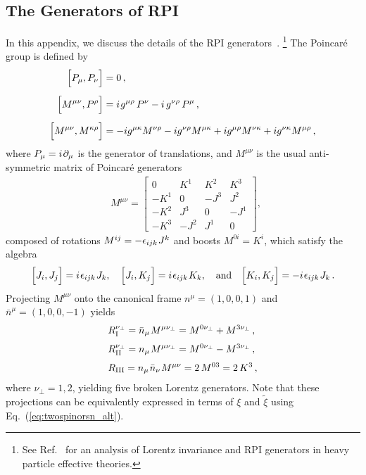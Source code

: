 \documentclass[12pt,document,nofootinbib,superscriptaddress,onecolumn,preprintnumbers,balancelastpage]{article}
\newcommand{\s}{\hspace{0.8pt}}
\DeclareRobustCommand{\Eq}[1]{Eq.~(\ref{#1})}
\DeclareRobustCommand{\Ref}[1]{Ref.~\cite{#1}}
\begin{document}
\begin{spacing}{1.2}
\section{The Generators of RPI}
\label{app:RPIgen}
In this appendix, we discuss the details of the RPI generators~\cite{Kogut:1969xa, Manohar:2002fd}.%
%
\footnote{See \Ref{Heinonen:2012km} for an analysis of Lorentz invariance and RPI generators in heavy particle effective theories.}
%
The Poincar\'e group is defined by
%
\begin{align}
\label{eq:poincare1}
\Big[P_\mu, P_\nu \Big] &= 0\,,\\[5pt] 
\label{eq:poincare2}
\Big[M^{\mu\nu},P^\rho \Big] &= i\s g^{\mu\rho}\,P^\nu-i\,g^{\nu\rho}\,P^\mu \,, \\[5pt]
\label{eq:poincare3}
\Big[M^{\mu \nu}, M^{\kappa \rho}\Big] &= - i g^{\mu \kappa} M^{\nu \rho} - i g^{\nu \rho} M^{\mu \kappa} + i g^{\mu \rho} M^{\nu \kappa} + i g^{\nu \kappa}M^{\mu \rho}\, ,
\end{align}
%
where $P_\mu = i\s  \partial_\mu$ is the generator of translations, and $M^{\mu \nu}$ is the usual anti-symmetric matrix of Poincar\'e generators
%
\begin{align}
& M^{\mu \nu} = 
\left[ \begin{array}{cccc}
0 & K^1 & K^2 & K^3  \\
-K^1 & 0 & - J^3 & J^2 \\
-K^2 & J^3 & 0 & -J^1 \\
-K^3 & - J^2 & J^1 & 0
  \end{array} \right],  \,
\end{align}
%
composed of rotations $M^{ij} = - \epsilon_{ijk}\s J^k$ and boosts $M^{0i} = K^i$, which satisfy the algebra
%
\begin{align}
\Big[J_i , J_j \Big] = i \s\epsilon_{ijk}\s J_k,\quad \Big[ J_i, K_j \Big] = i \s \epsilon_{ijk} \s K_k, \quad \text{and}\quad \Big[ K_i, K_j\Big] = - i\s \epsilon_{ijk} \s J_k\,. 
\end{align}
Projecting $M^{\mu\nu}$ onto the canonical frame $n^\mu = (1,0,0,1)$ and $\bar{n}^\mu = (1,0,0,-1)$ yields
\begin{align}
\label{eq:LCgenbreaking}
&R_{\rm I}^{\nu_\perp} = \bar{n}_\mu\s M^{\mu \nu_\perp} = M^{0 \nu_\perp} + M^{3 \nu_\perp} \,,\\[3pt] \nonumber
&R_{\rm II}^{\nu_\perp} = n_\mu\s M^{\mu \nu_\perp} = M^{0 \nu_\perp} - M^{3 \nu_\perp}\,, \\[3pt] \nonumber
& R_{\rm III} = n_\mu\s \bar{n}_\nu\s M^{\mu \nu} = 2\, M^{03} = 2\, K^3\,,
\end{align}
where $\nu_\perp = 1,2$, yielding five broken Lorentz generators.  Note that these projections can be equivalently expressed in terms of $\xi$ and $\tilde{\xi}$ using \Eq{eq:twospinorsn_alt}.





\end{spacing}
\end{document}
